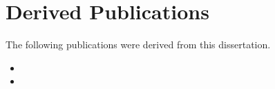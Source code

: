 \chapter{Derived Publications}
\label{app:derived_publications}

The following publications were derived from this dissertation.





\begin{itemize}
      \item {}

      \item \begingroup
            \endgroup


\end{itemize}

